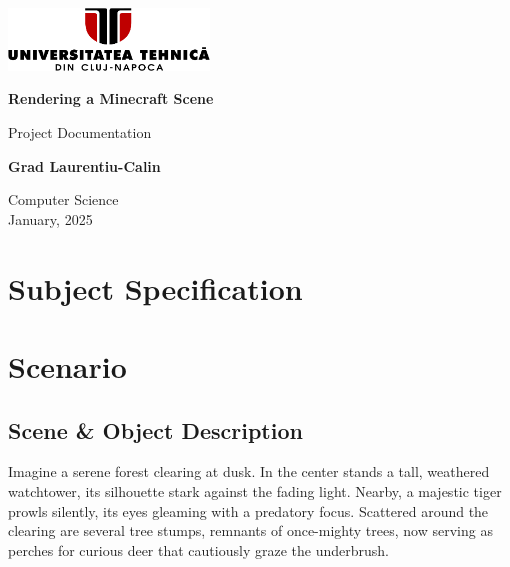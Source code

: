\documentclass[12pt]{article}
\begin{document}
	\begin{titlepage}
		\centering
		
		\includegraphics[width=0.4\textwidth]{Resources/logo_utcn.png}\\
		\vspace*{6cm}
		
		\Huge
		\textbf{Rendering a Minecraft Scene}
		
		\vspace{0.5cm}
		\Large
		Project Documentation
		
		\vspace{1.5cm}
		
		\textbf{Grad Laurentiu-Calin}\\
		
		\vfill
		
		\Large
		Computer Science\\
		January, 2025\\
		
	\end{titlepage}
	
	\newpage
	
	\tableofcontents
	
	\newpage
	
	\section{Subject Specification}
	
	
	
	\section{Scenario}
	\subsection{Scene \& Object Description}
	
	Imagine a serene forest clearing at dusk. In the center stands a tall, weathered watchtower, its silhouette stark against the fading light. Nearby, a majestic tiger prowls silently, its eyes gleaming with a predatory focus. Scattered around the clearing are several tree stumps, remnants of once-mighty trees, now serving as perches for curious deer that cautiously graze the underbrush.
	
\end{document}
